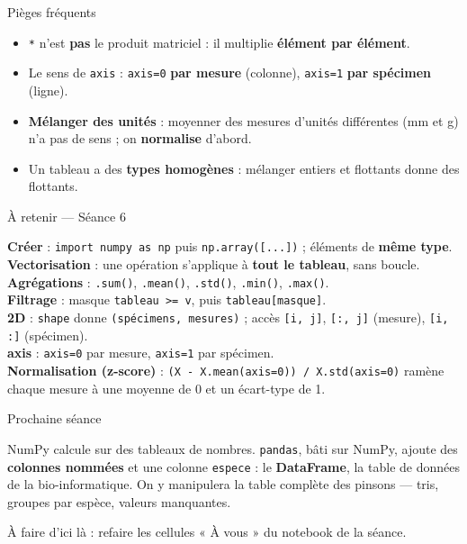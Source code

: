 \documentclass[aspectratio=169,11pt]{beamer}
\begin{document}
\begin{frame}{Pièges fréquents}
\begin{itemize}\small
  \item \texttt{*} n'est \textbf{pas} le produit matriciel : il multiplie \textbf{élément par élément}.
  \item Le sens de \texttt{axis} : \texttt{axis=0} \textbf{par mesure} (colonne), \texttt{axis=1} \textbf{par spécimen} (ligne).
  \item \textbf{Mélanger des unités} : moyenner des mesures d'unités différentes (mm et g) n'a pas de sens ; on \textbf{normalise} d'abord.
  \item Un tableau a des \textbf{types homogènes} : mélanger entiers et flottants donne des flottants.
\end{itemize}
\end{frame}

\begin{frame}{À retenir — Séance 6}
\begin{ucadret}[L'essentiel]
{\small
\textbf{Créer} : \texttt{import numpy as np} puis \texttt{np.array([...])} ; éléments de \textbf{même type}.\\[2pt]
\textbf{Vectorisation} : une opération s'applique à \textbf{tout le tableau}, sans boucle.\\[2pt]
\textbf{Agrégations} : \texttt{.sum()}, \texttt{.mean()}, \texttt{.std()}, \texttt{.min()}, \texttt{.max()}.\\[2pt]
\textbf{Filtrage} : masque \texttt{tableau >= v}, puis \texttt{tableau[masque]}.\\[2pt]
\textbf{2D} : \texttt{shape} donne \texttt{(spécimens, mesures)} ; accès \texttt{[i, j]}, \texttt{[:, j]} (mesure), \texttt{[i, :]} (spécimen).\\[2pt]
\textbf{axis} : \texttt{axis=0} par mesure, \texttt{axis=1} par spécimen.\\[2pt]
\textbf{Normalisation (z-score)} : \texttt{(X - X.mean(axis=0)) / X.std(axis=0)} ramène chaque mesure à une moyenne de 0 et un écart-type de 1.}
\end{ucadret}
\end{frame}

\begin{frame}{Prochaine séance}
\begin{ucaddef}
{\small NumPy calcule sur des tableaux de nombres. \texttt{pandas}, bâti sur NumPy, ajoute des \textbf{colonnes nommées} et une colonne \texttt{espece} : le \textbf{DataFrame}, la table de données de la bio-informatique. On y manipulera la table complète des pinsons — tris, groupes par espèce, valeurs manquantes.}
\end{ucaddef}
{\small À faire d'ici là : refaire les cellules « À vous » du notebook de la séance.}
\end{frame}
\end{document}
